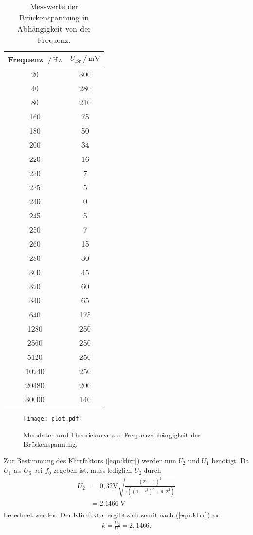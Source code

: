 \begin{table}[H]
  \centering
  \caption{Messwerte der Brückenspannung in Abhängigkeit von der Frequenz.}
  \label{tab:wertee}
  \begin{tabular}{c c}
    \toprule
    Frequenz $\,/\,\si{\hertz}$ &  $U_{\text{Br}}\,/\, \si{\milli\volt}$ \\
    \midrule
    20 & 300 \\
    40 & 280 \\
    80 & 210 \\
    160 & 75 \\
    180 & 50 \\
    200 & 34 \\
    220 & 16 \\
    230 & 7 \\
    235 & 5 \\
    240 & 0 \\
    245 & 5 \\
    250 & 7 \\
    260 & 15 \\
    280 & 30 \\
    300 & 45 \\
    320 & 60 \\
    340 & 65 \\
    640 & 175 \\
    1280 & 250 \\
    2560 & 250 \\
    5120 &  250 \\
    10240 & 250 \\
    20480 & 200 \\
    30000 & 140 \\
    \bottomrule
  \end{tabular}
\end{table}

\begin{figure}[H]
  \centering
  \texttt{[image: plot.pdf]}
  \caption{Messdaten und Theoriekurve zur Frequenzabhängigkeit der Brückenspannung.}
  \label{fig:plot}
\end{figure}

Zur Bestimmung des Klirrfaktors (\ref{eqn:klirr}) werden nun $U_2$ und $U_1$ benötigt. Da $U_1$ als $U_{\text{S}}$ bei $f_0$ gegeben ist, muss lediglich $U_2$ durch
\begin{align*}
  U_2 &= 0,32\si{\volt}{\sqrt{\frac{(2^2 - 1)^2}{9((1-2^2)^2 + 9 \cdot 2^2)}}} \\
  &= \SI{2,1466}{\volt} \\
\end{align*}
berechnet werden.
Der Klirrfaktor ergibt sich somit nach (\ref{eqn:klirr}) zu
\begin{align*}
  k = \frac{U_2}{U_1} = 2,1466. \\
\end{align*}